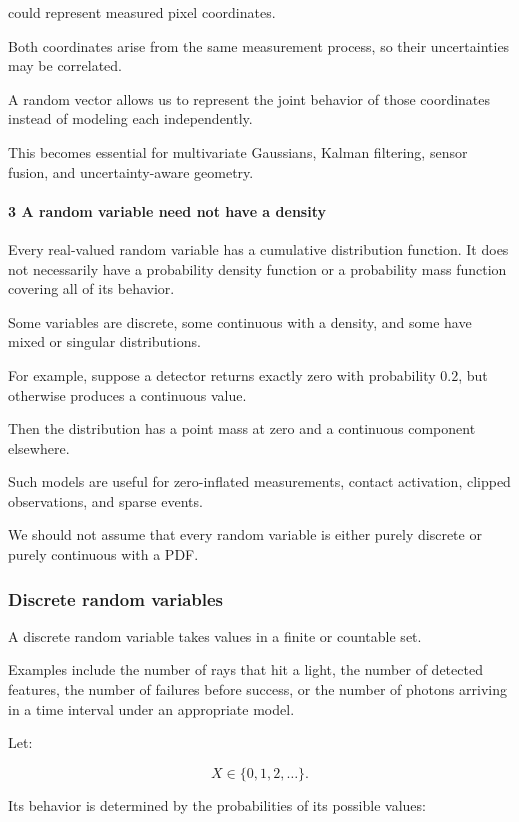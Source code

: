could represent measured pixel coordinates.

Both coordinates arise from the same measurement process, so their uncertainties may be correlated.

A random vector allows us to represent the joint behavior of those coordinates instead of modeling each independently.

This becomes essential for multivariate Gaussians, Kalman filtering, sensor fusion, and uncertainty-aware geometry.

\paragraph{3 A random variable need not have a density}\label{a-random-variable-need-not-have-a-density}

Every real-valued random variable has a cumulative distribution function. It does not necessarily have a probability density function or a probability mass function covering all of its behavior.

Some variables are discrete, some continuous with a density, and some have mixed or singular distributions.

For example, suppose a detector returns exactly zero with probability \(0.2\), but otherwise produces a continuous value.

Then the distribution has a point mass at zero and a continuous component elsewhere.

Such models are useful for zero-inflated measurements, contact activation, clipped observations, and sparse events.

We should not assume that every random variable is either purely discrete or purely continuous with a PDF.

\subsubsection{Discrete random variables}\label{discrete-random-variables}

A discrete random variable takes values in a finite or countable set.

Examples include the number of rays that hit a light, the number of detected features, the number of failures before success, or the number of photons arriving in a time interval under an appropriate model.

Let:

\[
 X\in\{0,1,2,\ldots\}.
\]

Its behavior is determined by the probabilities of its possible values:

